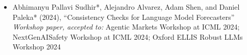 \documentclass{article}
\begin{document}
\begin{itemize}


    \item
          Abhimanyu Pallavi Sudhir*, Alejandro Alvarez, Adam Shen, and Daniel Paleka* (2024), ``Consistency Checks for Language Model Forecasters'' \emph{Workshop paper, accepted to:} Agentic Markets Workshop at ICML 2024; NextGenAISafety Workshop at ICML 2024; Oxford ELLIS Robust LLMs Workshop 2024
\end{itemize}
\end{document}
